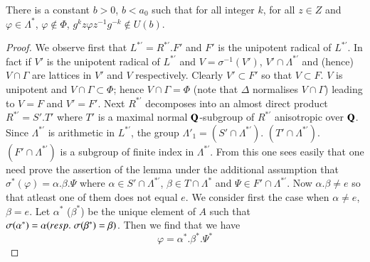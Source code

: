 \setcounter{lemma}{34}
\begin{lemma}\label{art9-lem2.35}
There is a constant $b > 0$, $b < a_0$ such that for all integer $k$, for all $z \in Z$ and $\varphi \in \Lambda^\ast$, $\varphi \not\in \Phi$, $g^k z \varphi z^{-1} g^{-k} \not\in U (b)$.
\end{lemma}

\begin{proof}
We observe first that $L^{\ast'} = R^{\ast'}. F'$ and $F'$ is the unipotent radical of $L^{\ast'}$. In fact if $V'$ is the unipotent radical of $L^{\ast'}$ and $V = \sigma^{-1} (V')$, $V' \cap \Lambda^{\ast'}$ and (hence) $V \cap \Gamma$ are lattices in $V'$ and $V$ respectively. Clearly $V' \subset F'$ so that $V \subset F$. $V$ is unipotent and $V \cap \Gamma \subset \Phi$; hence $V \cap \Gamma = \Phi$ (note that $\Delta$ normalises $V \cap \Gamma$) leading to $V = F$ and $V' = F'$. Next $R^{\ast'}$ decomposes into an almost direct product $R^{\ast'} = S'. T'$ where $T'$ is a maximal normal $\mathbf{Q}$-subgroup of $R^{\ast'}$ anisotropic over $\mathbf{Q}$. Since $\Lambda^{\ast'}$ is arithmetic in $L^{\ast'}$, the group $\Lambda'_1 = (S' \cap \Lambda^{\ast'})$. $(T' \cap \Lambda^{\ast'})$. $(F' \cap \Lambda^{\ast'})$ is a subgroup of finite index in $\Lambda^{\ast'}$. From this one sees easily that one need prove the assertion of the lemma under the additional assumption that $\sigma^\ast(\varphi) = \alpha. \beta. \Psi$ where $\alpha \in S' \cap \Lambda^{\ast'}$, $\beta \in T \cap \Lambda^\ast$ and $\Psi \in F' \cap \Lambda^{\ast'}$. Now $\alpha. \beta \neq e$ so that atleast one of them does not equal $e$. We consider first the case when $\alpha \neq e$, $\beta = e$. Let $\alpha^\ast$ (\resp $\beta^\ast$) be the unique element of $A$ such that $\sigma (\alpha^\ast) = \alpha ({resp.}\kern.3em \sigma (\beta^\ast) = \beta)$. Then we find that we have
$$
\varphi = \alpha^\ast . \beta^\ast. \Psi^\ast
$$

\end{proof}
